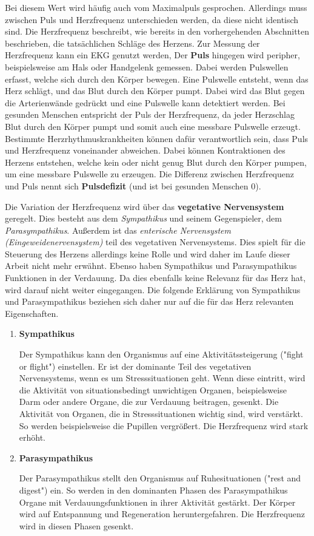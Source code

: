 Bei diesem Wert wird häufig auch vom Maximalpuls gesprochen. Allerdings muss zwischen Puls und Herzfrequenz unterschieden werden, da diese nicht identisch sind. 
Die Herzfrequenz beschreibt, wie bereits in den vorhergehenden Abschnitten beschrieben, die tatsächlichen Schläge des Herzens. Zur Messung der Herzfrequenz kann ein EKG genutzt werden,
Der \textbf{Puls} hingegen wird peripher, beispielsweise am Hals oder Handgelenk gemessen. Dabei werden Pulswellen erfasst, welche sich durch den Körper bewegen. Eine Pulswelle entsteht, wenn das Herz schlägt, und das Blut durch den Körper pumpt. Dabei wird das Blut gegen die Arterienwände gedrückt und eine Pulswelle kann detektiert werden.
Bei gesunden Menschen entspricht der Puls der Herzfrequenz, da jeder Herzschlag Blut durch den Körper pumpt und somit auch eine messbare Pulswelle erzeugt. Bestimmte Herzrhythmuskrankheiten können dafür verantwortlich sein, dass Puls und Herzfrequenz voneinander abweichen. Dabei können Kontraktionen des Herzens entstehen, welche kein oder nicht genug Blut durch den Körper pumpen, um eine messbare Pulswelle zu erzeugen. Die Differenz zwischen Herzfrequenz und Puls nennt sich \textbf{Pulsdefizit} (und ist bei gesunden Menschen 0). \cite{babilon}

Die Variation der Herzfrequenz wird über das \textbf{vegetative Nervensystem} geregelt. Dies besteht aus dem \textit{Sympathikus} und seinem Gegenspieler, dem \textit{Parasympathikus}. Außerdem ist das \textit{enterische Nervensystem (Eingeweidenervensystem)} teil des vegetativen Nervensystems. Dies spielt für die Steuerung des Herzens allerdings keine Rolle und wird daher im Laufe dieser Arbeit nicht mehr erwähnt. Ebenso haben Sympathikus und Parasympathikus Funktionen in der Verdauung. Da dies ebenfalls keine Relevanz für das Herz hat, wird darauf nicht weiter eingegangen. Die folgende Erklärung von Sympathikus und Parasympathikus beziehen sich daher nur auf die für das Herz relevanten Eigenschaften.\cite{veg}

\begin{enumerate}
	\item \textbf{Sympathikus} 
	
	Der Sympathikus kann den Organismus auf eine Aktivitätssteigerung ("fight or flight") einstellen. Er ist der dominante Teil des vegetativen Nervensystems, wenn es um Stresssituationen geht. Wenn diese eintritt, wird die Aktivität von situationsbedingt unwichtigen Organen, beispielsweise Darm oder andere Organe, die zur Verdauung beitragen, gesenkt. 
	Die Aktivität von Organen, die in Stresssituationen wichtig sind, wird verstärkt. So werden beispielsweise die Pupillen vergrößert.
Die Herzfrequenz wird stark erhöht.\cite{sym}	
	
	\item \textbf{Parasympathikus}
	
	Der Parasympathikus stellt den Organismus auf Ruhesituationen ("rest and digest") ein. So werden in den dominanten Phasen des Parasympathikus Organe mit Verdauungsfunktionen in ihrer Aktivität gestärkt. Der Körper wird auf Entspannung und Regeneration heruntergefahren. 
	Die Herzfrequenz wird in diesen Phasen gesenkt.\cite{para}
\end{enumerate}

